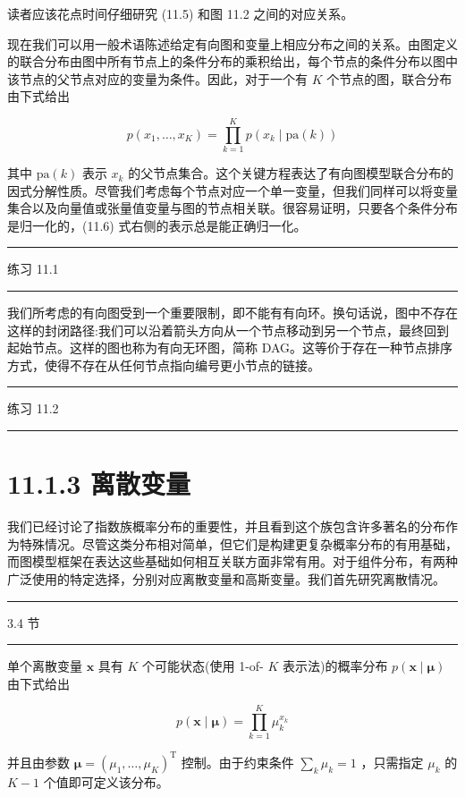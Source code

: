 \documentclass[10pt]{report}
\newcommand{\HRule}{\begin{center}\rule{0.9\linewidth}{0.2mm}\end{center}}
\begin{document}
读者应该花点时间仔细研究 (11.5) 和图 11.2 之间的对应关系。

现在我们可以用一般术语陈述给定有向图和变量上相应分布之间的关系。由图定义的联合分布由图中所有节点上的条件分布的乘积给出，每个节点的条件分布以图中该节点的父节点对应的变量为条件。因此，对于一个有 \(K\) 个节点的图，联合分布由下式给出

\[
p\left( {{x}_{1},\ldots ,{x}_{K}}\right)  = \mathop{\prod }\limits_{{k = 1}}^{K}p\left( {{x}_{k} \mid  \mathrm{{pa}}\left( k\right) }\right)  \tag{11.6}
\]

其中 \(\mathrm{{pa}}\left( k\right)\) 表示 \({x}_{k}\) 的父节点集合。这个关键方程表达了有向图模型联合分布的因式分解性质。尽管我们考虑每个节点对应一个单一变量，但我们同样可以将变量集合以及向量值或张量值变量与图的节点相关联。很容易证明，只要各个条件分布是归一化的，(11.6) 式右侧的表示总是能正确归一化。

\HRule

练习 11.1

\HRule

我们所考虑的有向图受到一个重要限制，即不能有有向环。换句话说，图中不存在这样的封闭路径:我们可以沿着箭头方向从一个节点移动到另一个节点，最终回到起始节点。这样的图也称为有向无环图，简称 DAG。这等价于存在一种节点排序方式，使得不存在从任何节点指向编号更小节点的链接。

\HRule

练习 11.2

\HRule

\section*{11.1.3 离散变量}

我们已经讨论了指数族概率分布的重要性，并且看到这个族包含许多著名的分布作为特殊情况。尽管这类分布相对简单，但它们是构建更复杂概率分布的有用基础，而图模型框架在表达这些基础如何相互关联方面非常有用。对于组件分布，有两种广泛使用的特定选择，分别对应离散变量和高斯变量。我们首先研究离散情况。

\HRule

3.4 节

\HRule

单个离散变量 \(\mathbf{x}\) 具有 \(K\) 个可能状态(使用 1-of- \(K\) 表示法)的概率分布 \(p\left( {\mathbf{x} \mid  \mathbf{\mu }}\right)\) 由下式给出

\[
p\left( {\mathbf{x} \mid  \mathbf{\mu }}\right)  = \mathop{\prod }\limits_{{k = 1}}^{K}{\mu }_{k}^{{x}_{k}} \tag{11.7}
\]

并且由参数 \(\mathbf{\mu } = {\left( {\mu }_{1},\ldots ,{\mu }_{K}\right) }^{\mathrm{T}}\) 控制。由于约束条件 \(\mathop{\sum }\limits_{k}{\mu }_{k} = 1\) ，只需指定 \({\mu }_{k}\) 的 \(K - 1\) 个值即可定义该分布。
\end{document}
